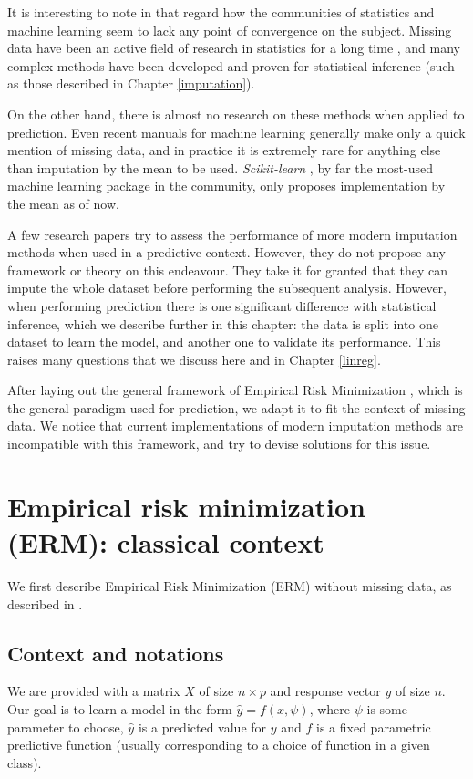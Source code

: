 \documentclass[12pt, a4paper]{memoir}
\begin{document}
It is interesting to note in that regard how the communities of statistics and machine learning seem to lack any point of convergence on the subject. Missing data have been an active field of research in statistics for a long time \cite{rubin1976inference}, and many complex methods have been developed and proven for statistical inference \cite{Rubin_missdata} (such as those described in Chapter \ref{imputation}).

On the other hand, there is almost no research on these methods when applied to prediction. Even recent manuals for machine learning \cite{ML_missdata} generally make only a quick mention of missing data, and in practice it is extremely rare for anything else than imputation by the mean to be used. \emph{Scikit-learn} \cite{scikit-learn}, by far the most-used machine learning package in the community, only proposes implementation by the mean as of now. 

A few research papers \cite{prediction_imputation1} \cite{prediction_imputation2} try to assess the performance of more modern imputation methods when used in a predictive context. However, they do not propose any framework or theory on this endeavour. They take it for granted that they can impute the whole dataset before performing the subsequent analysis. However, when performing prediction there is one significant difference with statistical inference, which we describe further in this chapter: the data is split into one dataset to learn the model, and another one to validate its performance. This raises many questions that we discuss here and in Chapter \ref{linreg}. 

After laying out the general framework of Empirical Risk Minimization \cite{ERM}, which is the general paradigm used for prediction, we adapt it to fit the context of missing data. We notice that current implementations of modern imputation methods are incompatible with this framework, and try to devise solutions for this issue.
	\section{Empirical risk minimization (ERM): classical context}
We first describe Empirical Risk Minimization (ERM) without missing data, as described in \cite{ERM}.
		\subsection{Context and notations}
We are provided with a matrix $X$ of size $n \times p$ and response vector $y$ of size $n$. Our goal is to learn a model in the form $\hat{y} = f(x, \psi)$, where $\psi$ is some parameter to choose, $\hat{y}$ is a predicted value for $y$ and $f$ is a fixed parametric predictive function (usually corresponding to a choice of function in a given class).
\end{document}
